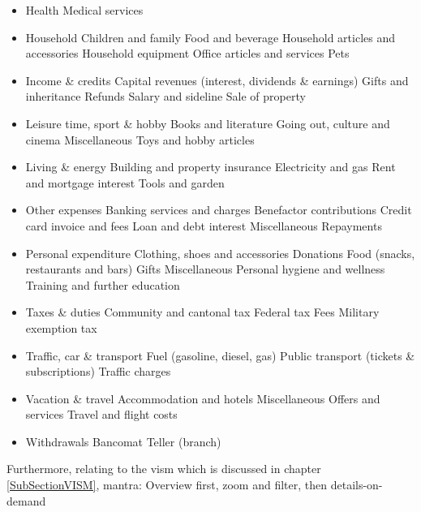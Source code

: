 \begin{itemize}[noitemsep,nolistsep]

	\item Health
		\subitem Medical services 
	\item Household
		\subitem Children and family
		\subitem Food and beverage
		\subitem Household articles and accessories
		\subitem Household equipment
		\subitem Office articles and services
		\subitem Pets
	\item Income \& credits
		\subitem Capital revenues (interest, dividends \& earnings)
		\subitem Gifts and inheritance
		\subitem Refunds
		\subitem Salary and sideline
		\subitem Sale of property
	\item Leisure time, sport \& hobby
		\subitem Books and literature
		\subitem Going out, culture and cinema
		\subitem Miscellaneous
		\subitem Toys and hobby articles
	\item Living \& energy
		\subitem Building and property insurance
		\subitem Electricity and gas
		\subitem Rent and mortgage interest
		\subitem Tools and garden
	\item Other expenses
		\subitem Banking services and charges
		\subitem Benefactor contributions
		\subitem Credit card invoice and fees
		\subitem Loan and debt interest
		\subitem Miscellaneous
		\subitem Repayments
	\item Personal expenditure
		\subitem Clothing, shoes and accessories
		\subitem Donations
		\subitem Food (snacks, restaurants and bars)
		\subitem Gifts
		\subitem Miscellaneous
		\subitem Personal hygiene and wellness
		\subitem Training and further education
	\item Taxes \& duties
		\subitem Community and cantonal tax
		\subitem Federal tax
		\subitem Fees
		\subitem Military exemption tax
	\item Traffic, car \& transport
		\subitem Fuel (gasoline, diesel, gas)
		\subitem Public transport (tickets \& subscriptions)
		\subitem Traffic charges
	\item Vacation \& travel
		\subitem Accommodation and hotels
		\subitem Miscellaneous
		\subitem Offers and services
		\subitem Travel and flight costs
	\item Withdrawals
		\subitem Bancomat
		\subitem Teller (branch)
\end{itemize}


Furthermore, relating to the \gls{vism} which is discussed in chapter \ref{SubSectionVISM}, 
mantra: Overview first, zoom and filter, then details-on-demand

